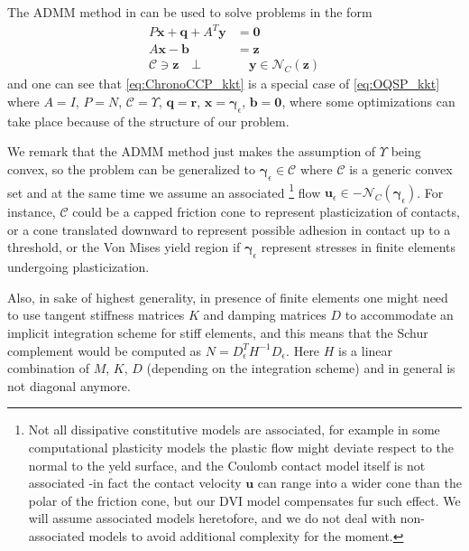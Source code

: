 \documentclass[final,3p]{elsarticle}
\newcommand{\vect}[1]{\bm{#1}}
\begin{document}
The ADMM method in \cite{Stellato2020} can be used to solve problems in the form
\begin{subequations}
	\begin{align}
    P \vect{x} + \vect{q} + A^T \vect{y} &= \vect{0} \\
    A \vect{x} - \vect{b} &= \vect{z} \\
    \mathcal{C} \ni \vect{z}  \quad \bot &\quad \vect{y} \in \mathcal{N}_{C}(\vect{z})
	\end{align}
	\label{eq:OQSP_kkt}
\end{subequations}
and one can see that \eqref{eq:ChronoCCP_kkt} is a special case of \eqref{eq:OQSP_kkt} where $A=I$, $P=N$, $\mathcal{C}=\Upsilon$, $\vect{q}=\vect{r}$, $\vect{x}=\vect{\gamma}_\epsilon$, $\vect{b}=\vect{0}$, where some optimizations can take place because of the structure of our problem.


We remark that the ADMM method just makes the assumption of $\Upsilon$ being convex, so the problem can be generalized to $\vect{\gamma}_\epsilon \in \mathcal{C}$ where $\mathcal{C}$ is a generic convex set and at the same time we assume an associated 
 \footnote{Not all dissipative constitutive models are associated, for example in some computational plasticity models the plastic flow might deviate respect to the normal to the yeld surface, and the Coulomb contact model itself is not associated -in fact the contact velocity $\vect{u}$ can range into a wider cone than the polar of the friction cone, but our DVI model compensates fur such effect. We will assume associated models heretofore, and we do not deal with non-associated models to avoid additional complexity for the moment.} 
flow $\vect{u}_\epsilon \in - \mathcal{N}_{C}(\vect{\gamma}_\epsilon)$. For instance, $\mathcal{C}$ could be a capped friction cone to represent plasticization of contacts, or a cone translated downward to represent possible adhesion in contact up to a threshold, or the Von Mises yield region if $\vect{\gamma}_\epsilon$ represent stresses in finite elements undergoing plasticization. 

Also, in sake of highest generality, in presence of finite elements one might need to use tangent stiffness matrices $K$ and damping matrices $D$ to accommodate an implicit integration scheme for stiff elements, and this means that the Schur complement would be computed as $N=D_{\epsilon}^T H^{-1} D_{\epsilon}$. Here $H$ is a linear combination of $M$, $K$, $D$ (depending on the integration scheme) and in general is not diagonal anymore. 
\end{document}
